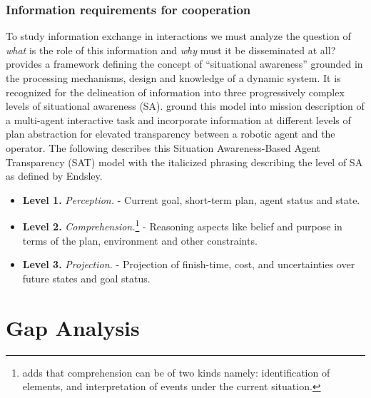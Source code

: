 \documentclass[letterpaper, 10 pt, conference]{ieeeconf}  %
\theoremstyle{definition}
\begin{document}
\subsubsection{Information requirements for cooperation}

To study information exchange in interactions we must analyze the question of \textit{what} is the role of this information and \textit{why} must it be disseminated at all?
\citeauthor{endsley1988design} \cite{endsley1988design} provides a framework defining the concept of ``situational awareness'' grounded in the processing mechanisms, design and knowledge of a dynamic system.
It is recognized for the delineation of information into three progressively complex levels of situational awareness (SA).
\citeauthor{chen2018situation} \cite{chen2018situation} ground this model into mission description of a multi-agent interactive task and incorporate information at different levels of plan abstraction for elevated transparency between a robotic agent and the operator.
The following describes this Situation Awareness-Based Agent Transparency (SAT) model with the italicized phrasing describing the level of SA as defined by Endsley.
\begin{itemize}
    \item \textbf{Level 1.} \textit{Perception.} - Current goal, short-term plan, agent status and state.
    \item \textbf{Level 2.} \textit{Comprehension.}\footnote{\cite{Burke2004Miami} adds that comprehension can be of two kinds namely: identification of elements, and interpretation of events under the current situation.} -  Reasoning aspects like belief and purpose in terms of the plan, environment and other constraints.
    \item \textbf{Level 3.} \textit{Projection.} - Projection of finish-time, cost, and uncertainties over future states and goal status.
\end{itemize}


\section{Gap Analysis}
\label{sec:analysis}
\end{document}
